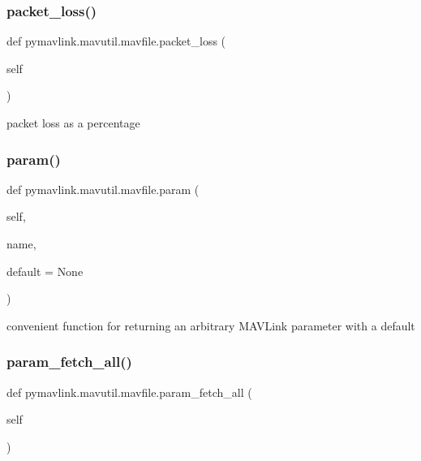 \subsubsection{\texorpdfstring{packet\+\_\+loss()}{packet\_loss()}}
{\footnotesize\ttfamily def pymavlink.\+mavutil.\+mavfile.\+packet\+\_\+loss (\begin{DoxyParamCaption}\item[{}]{self }\end{DoxyParamCaption})}

\begin{DoxyVerb}packet loss as a percentage\end{DoxyVerb}
 \mbox{\label{classpymavlink_1_1mavutil_1_1mavfile_af62c2fd5d5957067fd74eef6c08dcd9a}} 
\subsubsection{\texorpdfstring{param()}{param()}}
{\footnotesize\ttfamily def pymavlink.\+mavutil.\+mavfile.\+param (\begin{DoxyParamCaption}\item[{}]{self,  }\item[{}]{name,  }\item[{}]{default = {\ttfamily None} }\end{DoxyParamCaption})}

\begin{DoxyVerb}convenient function for returning an arbitrary MAVLink
   parameter with a default\end{DoxyVerb}
 \mbox{\label{classpymavlink_1_1mavutil_1_1mavfile_a5337d04307871f7ac873a17eb24b3180}} 
\subsubsection{\texorpdfstring{param\+\_\+fetch\+\_\+all()}{param\_fetch\_all()}}
{\footnotesize\ttfamily def pymavlink.\+mavutil.\+mavfile.\+param\+\_\+fetch\+\_\+all (\begin{DoxyParamCaption}\item[{}]{self }\end{DoxyParamCaption})}

